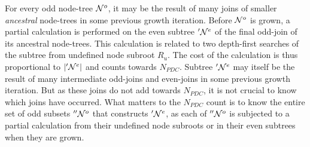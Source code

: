 For every odd node-tree $\mathcal{N}^o$, it may be the result of many joins of smaller \emph{ancestral} node-trees in some previous growth iteration. Before $\mathcal{N}^o$ is grown, a partial calculation is performed on the even subtree $'\mathcal{N}^e$ of the final odd-join of its ancestral node-trees. This calculation is related to two depth-first searches of the subtree from undefined node subroot $R_u$. The cost of the calculation is thus proportional to $|'\mathcal{N}^e|$ and counts towards $N_{PDC}$. Subtree $'\mathcal{N}^e$ may itself be the result of many intermediate odd-joins and even-joins in some previous growth iteration. But as these joins do not add towards $N_{PDC}$, it is not crucial to know which joins have occurred. What matters to the $N_{PDC}$ count is to know the entire set of odd subsets $''\mathcal{N}^o$ that constructs $'\mathcal{N}^e$, as each of $''\mathcal{N}^o$ is subjected to a partial calculation from their undefined node subroots or in their even subtrees when they are grown.

